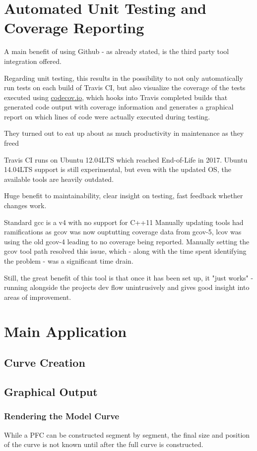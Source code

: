 \section{Automated Unit Testing and Coverage Reporting}
A main benefit of using Github - as already stated, is the third party tool integration offered.

Regarding unit testing, this results in the possibility to not only automatically run tests on each build of Travis CI, but also visualize the \gls{coverage} of the tests executed using \url{codecov.io}, which hooks into Travis completed builds that generated code output with coverage information and generates a graphical report on which lines of code were actually executed during testing.

They turned out to eat up about as much productivity in maintenance as they freed

Travis CI runs on Ubuntu 12.04LTS which reached End-of-Life in 2017. Ubuntu 14.04LTS support is still experimental, but even with the updated OS, the available tools are heavily outdated.

Huge benefit to maintainability, clear insight on testing, fast feedback whether changes work.

Standard gcc is a v4 with no support for C++11
Manually updating tools had ramifications as gcov was now ouptutting coverage data from gcov-5, lcov was using the old gcov-4 leading to no coverage being reported. Manually setting the gcov tool path resolved this issue, which - along with the time spent identifying the problem - was a significant time drain.

Still, the great benefit of this tool is that once it has been set up, it "just works" - running alongside the projects dev flow unintrusively and gives good insight into areas of improvement.

\section{Main Application}

\subsection{Curve Creation}

\subsection{Graphical Output}
\subsubsection{Rendering the Model Curve}
While a PFC can be constructed segment by segment, the final size and position of the curve is not known until after the full curve is constructed.

